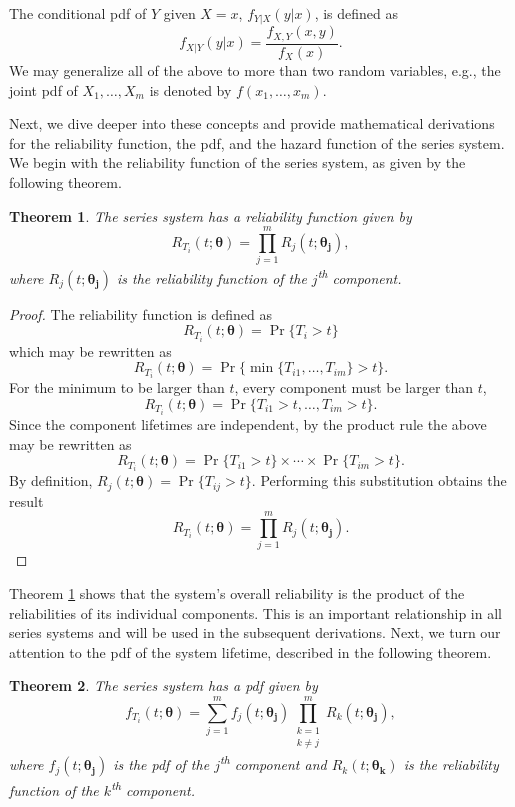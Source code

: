\documentclass[
]{article}
\theoremstyle{definition}
\theoremstyle{plain}
\newtheorem{theorem}{Theorem}[section]
\theoremstyle{definition}
\theoremstyle{definition}
\theoremstyle{definition}
\theoremstyle{definition}
\theoremstyle{remark}
\begin{document}
The conditional pdf of \(Y\) given \(X=x\), \(f_{Y|X}(y|x)\), is defined as
\[
f_{X|Y}(y|x) = \frac{f_{X,Y}(x,y)}{f_X(x)}.
\]
We may generalize all of the above to more than two random variables, e.g.,
the joint pdf of \(X_1,\ldots,X_m\) is denoted by \(f(x_1,\ldots,x_m)\).

Next, we dive deeper into these concepts and provide mathematical derivations for
the reliability function, the pdf, and the hazard function of the series system.
We begin with the reliability function of the series system, as given by the following theorem.

\begin{theorem}
\protect\hypertarget{thm:sys-reliability-fn}{}\label{thm:sys-reliability-fn}The series system has a reliability function given by
\begin{equation}
\label{eq:sys-reliability-fn}
R_{T_i}(t;\boldsymbol{\theta}) = \prod_{j=1}^m R_j(t;\boldsymbol{\theta_j}),
\end{equation}
where \(R_j(t;\boldsymbol{\theta_j})\) is the reliability function of the \(j\)\textsuperscript{th} component.
\end{theorem}

\begin{proof}
The reliability function is defined as
\[
  R_{T_i}(t;\boldsymbol{\theta}) = \Pr\{T_i > t\}
\]
which may be rewritten as
\[
  R_{T_i}(t;\boldsymbol{\theta}) = \Pr\{\min\{T_{i 1},\ldots,T_{i m}\} > t\}.
\]
For the minimum to be larger than \(t\), every component must be larger than \(t\),
\[
  R_{T_i}(t;\boldsymbol{\theta}) = \Pr\{T_{i 1} > t,\ldots,T_{i m} > t\}.
\]
Since the component lifetimes are independent, by the product rule the above may
be rewritten as
\[
  R_{T_i}(t;\boldsymbol{\theta}) = \Pr\{T_{i 1} > t\} \times \cdots \times \Pr\{T_{i m} > t\}.
\]
By definition, \(R_j(t;\boldsymbol{\theta}) = \Pr\{T_{i j} > t\}\).
Performing this substitution obtains the result
\[
  R_{T_i}(t;\boldsymbol{\theta}) = \prod_{j=1}^m R_j(t;\boldsymbol{\theta_j}).
\]
\end{proof}

Theorem \ref{thm:sys-reliability-fn} shows that the system's overall reliability is the
product of the reliabilities of its individual components. This is an important relationship
in all series systems and will be used in the subsequent derivations. Next, we turn our
attention to the pdf of the system lifetime, described in the following theorem.

\begin{theorem}
\protect\hypertarget{thm:sys-pdf}{}\label{thm:sys-pdf}The series system has a pdf given by
\begin{equation}
\label{eq:sys-pdf}
f_{T_i}(t;\boldsymbol{\theta}) = \sum_{j=1}^m f_j(t;\boldsymbol{\theta_j})
    \prod_{\substack{k=1\\k\neq j}}^m R_k(t;\boldsymbol{\theta_j}),
\end{equation}
where \(f_j(t;\boldsymbol{\theta_j})\) is the pdf of the \(j\)\textsuperscript{th} component
and \(R_k(t;\boldsymbol{\theta_k})\) is the reliability function of the \(k\)\textsuperscript{th} component.
\end{theorem}
\end{document}
